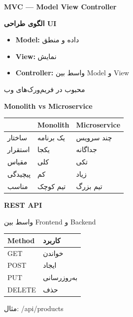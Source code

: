 \documentclass[14pt, a4paper, landscape]{extarticle}
\newcommand{\slide}[1]{%
    \newpage
    \begin{center}
    \begin{minipage}[t]{0.95\textwidth}
    \vspace{0.5cm}
    #1
    \vspace{0.5cm}
    \end{minipage}
    \end{center}
}
\newcommand{\slidetitle}[1]{%
    \begin{center}
        {\LARGE\bfseries\textcolor{primary}{#1}}
    \end{center}
    \vspace{0.5cm}
}
\newcommand{\myaccent}[1]{\textcolor{accent}{#1}}
\begin{document}
\slide{
    \slidetitle{MVC — Model View Controller}
    \vspace{0.5cm}
    \begin{center}
        {\large\bfseries الگوی طراحی UI}
    \end{center}
    \vspace{0.5cm}
    \begin{itemize}[itemsep=0.5em]
        \item \textbf{Model:} داده و منطق
        \item \textbf{View:} نمایش
        \item \textbf{Controller:} واسط بین Model و View
    \end{itemize}
    \vspace{0.5cm}
    \begin{center}
        {\myaccent{محبوب در فریم‌ورک‌های وب}}
    \end{center}
}

\slide{
    \slidetitle{Monolith vs Microservice}
    \vspace{0.3cm}
    \begin{center}
        \begin{tabular}{lp{3.5cm}p{3.5cm}}
            \toprule
            & \textbf{Monolith} & \textbf{Microservice} \\
            \midrule
            ساختار & یک برنامه & چند سرویس \\
            \hline
            استقرار & یکجا & جداگانه \\
            \hline
            مقیاس & کلی & تکی \\
            \hline
            پیچیدگی & کم & زیاد \\
            \hline
            مناسب & تیم کوچک & تیم بزرگ \\
            \bottomrule
        \end{tabular}
    \end{center}
}

\slide{
    \slidetitle{REST API}
    \vspace{0.5cm}
    {\large واسط بین Frontend و Backend}
    \vspace{0.8cm}
    \begin{center}
        \begin{tabular}{ll}
            \toprule
            \textbf{Method} & \textbf{کاربرد} \\
            \midrule
            GET & خواندن \\
            \hline
            POST & ایجاد \\
            \hline
            PUT & به‌روزرسانی \\
            \hline
            DELETE & حذف \\
            \bottomrule
        \end{tabular}
    \end{center}
    \vspace{0.5cm}
    \begin{center}
        {\myaccent{مثال: /api/products}}
    \end{center}
}
\end{document}
